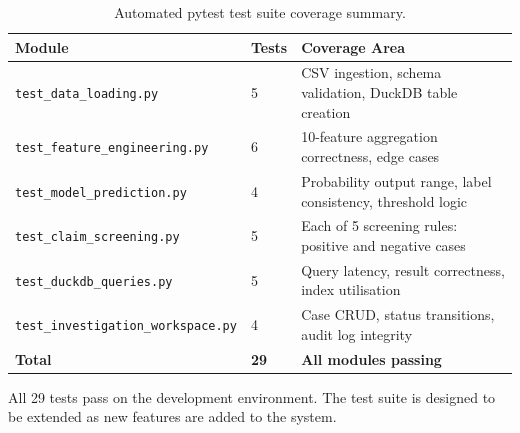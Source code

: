 \begin{table}[htbp]
\centering
\caption{Automated pytest test suite coverage summary.}
\label{tab:test-modules}
\begin{tabular}{@{}llp{6cm}@{}}
\toprule
\textbf{Module} & \textbf{Tests} & \textbf{Coverage Area} \\
\midrule
\texttt{test\_data\_loading.py}          & 5 & CSV ingestion, schema validation, DuckDB table creation \\
\texttt{test\_feature\_engineering.py}  & 6 & 10-feature aggregation correctness, edge cases \\
\texttt{test\_model\_prediction.py}     & 4 & Probability output range, label consistency, threshold logic \\
\texttt{test\_claim\_screening.py}      & 5 & Each of 5 screening rules: positive and negative cases \\
\texttt{test\_duckdb\_queries.py}       & 5 & Query latency, result correctness, index utilisation \\
\texttt{test\_investigation\_workspace.py} & 4 & Case CRUD, status transitions, audit log integrity \\
\midrule
\textbf{Total} & \textbf{29} & \textbf{All modules passing} \\
\bottomrule
\end{tabular}
\end{table}

All 29 tests pass on the development environment. The test suite is designed to be extended as new features are added to the system.
